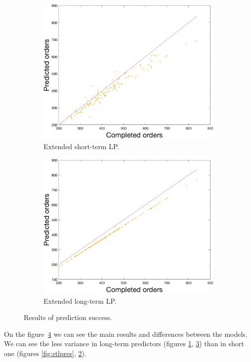 \begin{figure}[h!]
\begin{subfigure}[b]{0.4\textwidth}
            \label{fig:eltlpres}
        \end{subfigure}
        \begin{subfigure}[b]{0.4\textwidth}
            \includegraphics[width=\textwidth]{figures/expCompELP.png}
            \caption{Extended short-term LP.}
            \label{fig:eslpmse}
        \end{subfigure}
        \hspace{0.1\textwidth}
        \begin{subfigure}[b]{0.4\textwidth}
            \includegraphics[width=\textwidth]{figures/expCompELTLP.png}
            \caption{Extended long-term LP.}
            \label{fig:eltlpmse}
        \end{subfigure}
        \caption{Results of prediction success.}
        \label{fig:mseresults}
    \end{figure}
    
    On the figure~\ref{fig:mseresults} we can see the main results and
    differences between the models. We can see the less variance in
    long-term predictors (figures \ref{fig:eltlpres}, \ref{fig:eltlpmse})
    than in short one (figures \ref{fig:stlpres}, \ref{fig:eslpmse}).

